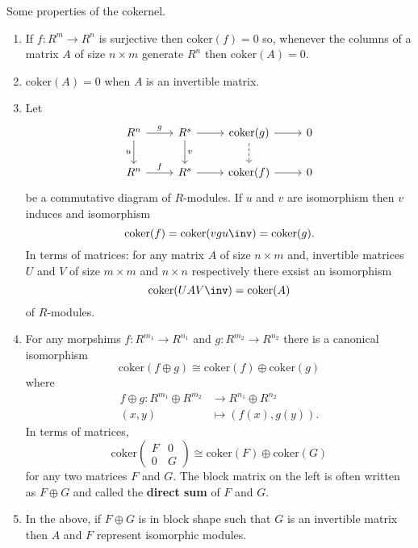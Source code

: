 \documentclass[12pt, a4paper]{article}
\begin{document}
\begin{mdprop}
    Some properties of the cokernel.
    \begin{enumerate}
        \item If \(f:R^m \to R^n\) is surjective then \(\text{coker}(f)=0\) so, whenever the columns of a matrix \(A\) of size \(n\times m\) generate \(R^n\) then \(\text{coker}(A)=0\).
        \item \(\text{coker}(A) =0\) when \(A\) is an invertible matrix.
        \item Let 
        \[\begin{tikzcd}
            R^n \arrow[r, "g"] \arrow[d, "u"'] & R^s \arrow[r] \arrow[d, "v"] & \text{coker}(g) \arrow[r] \arrow[d, dashed] & 0  \\
            R^n \arrow[r, "f"] & R^s \arrow[r] & \text{coker}(f) \arrow[r] & 0
        \end{tikzcd}\]
        be a commutative diagram of \(R\)-modules. If \(u\) and \(v\) are isomorphism then \(v\) induces and isomorphism 
        \[\text{coker}(f)=\text{coker}(vgu\inv)=\text{coker}(g).\]
        In terms of matrices: for any matrix \(A\) of size \(n\times m\) and, invertible matrices \(U\) and \(V\) of size \(m\times m\) and \(n\times n\)  respectively there exsist an isomorphism 
        \[\text{coker}(UAV\inv)=\text{coker}(A)\]
        of \(R\)-modules.
        \item For any morpshims \(f : R^{m_1} \to R^{n_1}\) and \(g:R^{m_2}\to R^{n_2}\) there is a canonical isomorphism 
        \[\text{coker}(f\oplus g)\cong \text{coker}(f)\oplus \text{coker}(g)\]
        where 
        \[\begin{aligned}
            f\oplus g: R^{m_1} \oplus R^{m_2}&\to R^{n_1}\oplus R^{n_2} \\
           (x,y) &\mapsto (f(x),g(y)).
        \end{aligned}\]
        In terms of matrices,
        \[\text{coker}\begin{pmatrix}
            F & 0 \\
            0 & G
            \end{pmatrix}
            \cong \text{coker}(F) \oplus \text{coker}(G)\] 
        for any two matrices \(F\) and \(G\). 
        The block matrix on the left is often written as \(F\oplus G\) and called the \textbf{direct sum} of \(F\) and \(G\).
        \item In the above, if \(F \oplus G\) is in block shape such that \(G\) is an invertible matrix then \(A\) and \(F\) represent isomorphic modules.
    \end{enumerate}
\end{mdprop}
\end{document}
